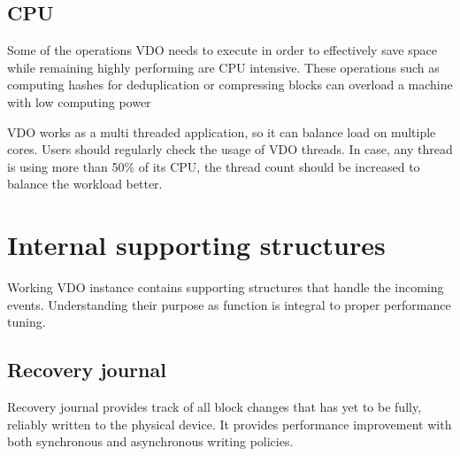 \documentclass[
  color, %
  table, %
  lof,   %
  lot,   %
]{fithesis3}
\begin{document}




\subsection{CPU}
Some of the operations VDO needs to execute in order to effectively save space while remaining highly performing are CPU intensive. These operations such as computing hashes for deduplication or compressing blocks can overload a machine with low computing power

VDO works as a multi threaded application, so it can balance load on multiple cores. Users should regularly check the usage of VDO threads. In case, any thread is using more than 50\% of its CPU, the thread count should be increased to balance the workload better.

\section{Internal supporting structures}
Working VDO instance contains supporting structures that handle the incoming events. Understanding their purpose as function is integral to proper performance tuning.


\subsection{Recovery journal}
Recovery journal provides track of all block changes that has yet to be fully, reliably written to the physical device. It provides performance improvement with both synchronous and asynchronous writing policies.
\end{document}
